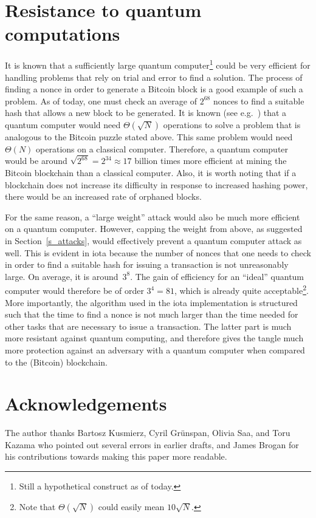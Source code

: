 \documentclass[12pt]{article}
\begin{document}
\section{Resistance to quantum computations}
\label{s_quantum}
It is known that a sufficiently large
 quantum computer\footnote{Still a hypothetical construct as of today.}
  could be very efficient for handling problems
that rely on trial and error to find a solution. The process of finding a nonce
in order to generate a Bitcoin block is a good example 
of such a problem. As of today, one must 
check an average of $2^{68}$ nonces to find a suitable hash
that allows a new block to be generated. 
 It is known (see e.g.~\cite{BHT}) that a quantum computer would need 
$\Theta(\sqrt{N})$ operations to solve a problem that is analogous to 
the Bitcoin puzzle stated above. This same problem would need
~$\Theta(N)$ operations on a classical computer.
Therefore, a quantum computer would be 
around $\sqrt{2^{68}}=2^{34}\approx 17$ billion times
more efficient at mining the Bitcoin blockchain than a classical computer.
Also, it is worth noting that
 if a blockchain does not increase its difficulty in response 
to increased hashing power, there would be an 
increased rate of orphaned blocks.

For the same reason, a ``large weight'' attack would also be much more 
efficient on a quantum computer.
However, capping the weight from above, as suggested
in Section~\ref{s_attacks}, would effectively prevent
a quantum computer attack as well. This is evident in iota because 
the number of nonces that one needs to check in order
to find a suitable hash for issuing a transaction is not 
unreasonably large. On average, it is around~$3^8$. 
The gain of efficiency for 
an ``ideal'' quantum computer would therefore
be of order $3^{4}=81$, which is already quite 
acceptable\footnote{Note that $\Theta(\sqrt{N})$
could easily mean $10\sqrt{N}$.}.
More importantly, the algorithm used in the iota implementation 
is structured such that the time to find a nonce is 
not much larger than the time needed for other tasks that 
are necessary to issue a transaction. The latter part is much
 more resistant against quantum computing, and therefore 
 gives the tangle much more protection against an adversary with a 
 quantum computer when compared to the (Bitcoin) blockchain.



\section*{Acknowledgements}
The author thanks  Bartosz Kusmierz, Cyril Gr\"unspan,
Olivia Saa, and
 Toru Kazama who pointed
out several errors in earlier drafts, and James Brogan
for his contributions towards making this paper more readable.
\end{document}
